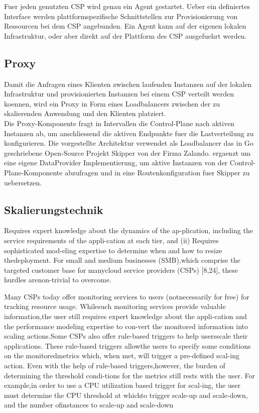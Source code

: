 \documentclass[runningheads]{llncs}
\begin{document}
Fuer jeden genutzten CSP wird genau ein Agent gestartet. Ueber ein definiertes Interface werden plattformspezifische Schnittstellen zur Provisionierung von Ressourcen bei dem CSP angebunden. Ein Agent kann auf der eigenen lokalen Infrastruktur, oder aber direkt auf der Plattform des CSP ausgefuehrt werden.
	
\subsection{Proxy}

Damit die Anfragen eines Klienten zwischen laufenden Instanzen auf der lokalen Infrastruktur und provisionierten Instanzen bei einem CSP verteilt werden koennen, wird ein Proxy in Form eines Loadbalancers zwischen der zu skalierenden Anwendung und den Klienten platziert. \\

Die Proxy-Komponente fragt in Intervallen die Control-Plane nach aktiven Instanzen ab, um anschliessend die aktiven Endpunkte fuer die Lastverteilung zu konfigurieren. Die vorgestellte Architektur verwendet als Loadbalancer das in Go geschriebene Open-Source Projekt Skipper von der Firma Zalando. ergaenzt um eine eigene DataProvider Implementierung, um aktive Instanzen von der Control-Plane-Komponente abzufragen und in eine Routenkonfiguration fuer Skipper zu uebersetzen.

\subsection{Skalierungstechnik} \label{skalierungstechnik}

Requires expert knowledge about the dynamics of the ap-plication, including the service requirements of the appli-cation at each tier, and (ii) Requires sophisticated mod-eling expertise to determine when and how to resize thedeployment. For small and medium businesses (SMB),which comprise the targeted customer base for manycloud service providers (CSPs) [8,24], these hurdles arenon-trivial to overcome.

Many CSPs today offer monitoring services to users (notnecessarily for free) for tracking resource usage. Whilesuch monitoring services provide valuable information,the user still requires expert knowledge about the appli-cation and the performance modeling expertise to con-vert the monitored information into scaling actions.Some CSPs also offer rule-based triggers to help usersscale their applications. These rule-based triggers allowthe users to specify some conditions on the monitoredmetrics which, when met, will trigger a pre-defined scal-ing action.  Even with the help of rule-based triggers,however, the burden of determining the threshold condi-tions for the metrics still rests with the user. For example,in order to use a CPU utilization based trigger for scal-ing, the user must determine the CPU threshold at whichto trigger scale-up and scale-down, and the number ofinstances to scale-up and scale-down
\end{document}
